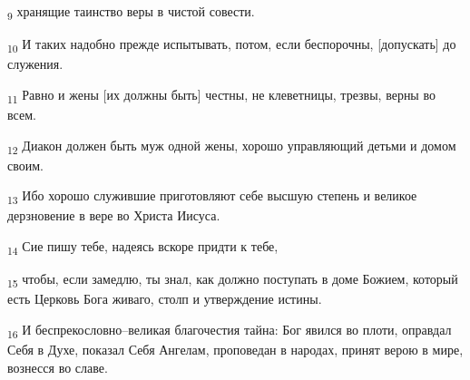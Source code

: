 \begin{tcolorbox}
\textsubscript{9} хранящие таинство веры в чистой совести.
\end{tcolorbox}
\begin{tcolorbox}
\textsubscript{10} И таких надобно прежде испытывать, потом, если беспорочны, [допускать] до служения.
\end{tcolorbox}
\begin{tcolorbox}
\textsubscript{11} Равно и жены [их должны быть] честны, не клеветницы, трезвы, верны во всем.
\end{tcolorbox}
\begin{tcolorbox}
\textsubscript{12} Диакон должен быть муж одной жены, хорошо управляющий детьми и домом своим.
\end{tcolorbox}
\begin{tcolorbox}
\textsubscript{13} Ибо хорошо служившие приготовляют себе высшую степень и великое дерзновение в вере во Христа Иисуса.
\end{tcolorbox}
\begin{tcolorbox}
\textsubscript{14} Сие пишу тебе, надеясь вскоре придти к тебе,
\end{tcolorbox}
\begin{tcolorbox}
\textsubscript{15} чтобы, если замедлю, ты знал, как должно поступать в доме Божием, который есть Церковь Бога живаго, столп и утверждение истины.
\end{tcolorbox}
\begin{tcolorbox}
\textsubscript{16} И беспрекословно--великая благочестия тайна: Бог явился во плоти, оправдал Себя в Духе, показал Себя Ангелам, проповедан в народах, принят верою в мире, вознесся во славе.
\end{tcolorbox}
